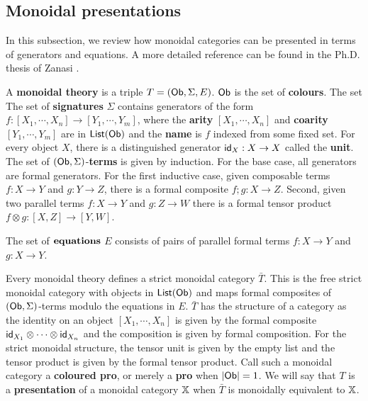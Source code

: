\subsection{Monoidal presentations}
\label{subsec:monpres}
In this subsection, we review how monoidal categories can be presented in terms of generators and equations. A more detailed reference can be found in the Ph.D. thesis of Zanasi \cite{ih}.
\begin{definition}
\label{def:monoidaltheory}
A {\bf monoidal theory} is a triple $T=({\sf Ob},\Sigma ,E )$. $\mathsf{Ob}$  is the set of {\bf colours}. The set The set of {\bf signatures} $\Sigma$ contains generators of the form $f:[X_1,\cdots, X_n]\to [Y_1,\cdots, Y_m]$, where  the {\bf arity} $[X_1,\cdots, X_n]$ and {\bf coarity} $[Y_1,\cdots, Y_m]$ are in $\mathsf{List}(\mathsf{Ob})$ and the {\bf name} is $f$ indexed from some fixed set. For every object $X$, there is a distinguished generator ${\sf id}_X:X\to X$ called the {\bf unit}.  The set of $(\mathsf{Ob},\Sigma)$-{\bf terms} is given by induction.  For the base case, all generators are formal generators.  For the first inductive case, given composable terms $f:X\to Y$ and $g:Y\to Z$, there is a formal composite $f;g:X\to Z$.  Second, given two parallel terms $f:X\to Y$ and $g:Z\to W$ there is a formal tensor product $f\otimes g:[X,Z]\to [Y,W]$. 

The set of ${\bf equations}$ $E$ consists of pairs of parallel formal terms $f:X\to Y$ and $g:X\to Y$.

Every monoidal theory defines a strict monoidal category $\bar T$. This is the free strict monoidal category with objects in  $\mathsf{List}(\mathsf{Ob})$ and maps formal composites of $(\mathsf{Ob},\Sigma)$-terms modulo the equations in $E$.  $\bar T$ has the structure of a category as the identity on an object $[X_1,\cdots, X_n]$ is given by the formal composite ${\sf id}_{X_1}\otimes \cdots\otimes {\sf id}_{X_n}$ and the composition is given by formal composition.  For the strict monoidal structure,  the tensor unit is given by the empty list and the tensor product is given by the formal tensor product.  Call such a monoidal category a {\bf coloured pro}, or merely a {\bf pro} when $|{\sf Ob}|=1$.  We will say that $T$ is a {\bf presentation} of a monoidal category $\mathbb{X}$ when $\bar T$ is monoidally equivalent to $\mathbb{X}$.  


\end{definition}
